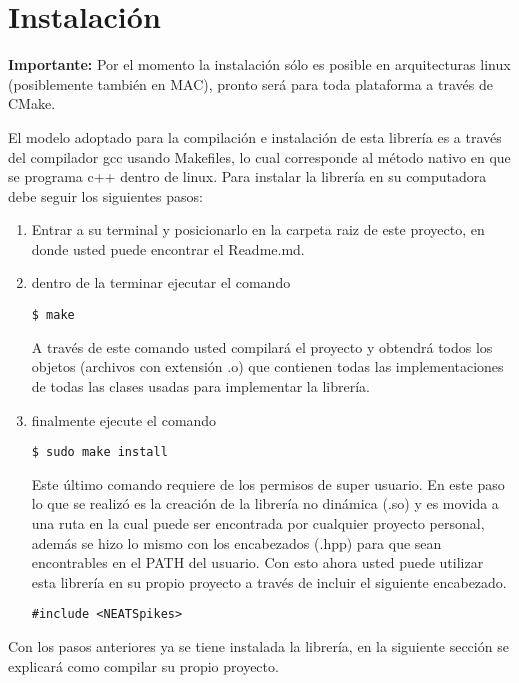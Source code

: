 \newpage
\section{Instalación}

\textbf{Importante:} Por el momento la instalación sólo es posible en arquitecturas linux (posiblemente también en MAC), pronto será para toda plataforma a través de CMake. \newline


El modelo adoptado para la compilación e instalación de esta librería es a través del compilador gcc usando Makefiles, lo cual corresponde al método nativo en que se programa c++ dentro de linux. Para instalar la librería en su computadora debe seguir los siguientes pasos: \newline

\begin{enumerate}
\item Entrar a su terminal y posicionarlo en la carpeta raiz de este proyecto, en donde usted puede encontrar el Readme.md.
\item dentro de la terminar ejecutar el comando 
\begin{lstlisting}
$ make
\end{lstlisting}
A través de este comando usted compilará el proyecto y obtendrá todos los objetos (archivos con extensión .o) que contienen todas las implementaciones de todas las clases usadas para implementar la librería.

\item finalmente ejecute el comando

\begin{lstlisting}
$ sudo make install
\end{lstlisting}

Este último comando requiere de los permisos de super usuario. En este paso lo que se realizó es la creación de la librería no dinámica (.so) y es movida a una ruta en la cual puede ser encontrada por cualquier proyecto personal, además se hizo lo mismo con los encabezados (.hpp) para que sean encontrables en el PATH del usuario. Con esto ahora usted puede utilizar esta librería en su propio proyecto a través de incluir  el siguiente encabezado.

\begin{lstlisting}
#include <NEATSpikes>
\end{lstlisting}


\end{enumerate}


Con los pasos anteriores ya se tiene instalada la librería, en la siguiente sección se explicará como compilar su propio proyecto.